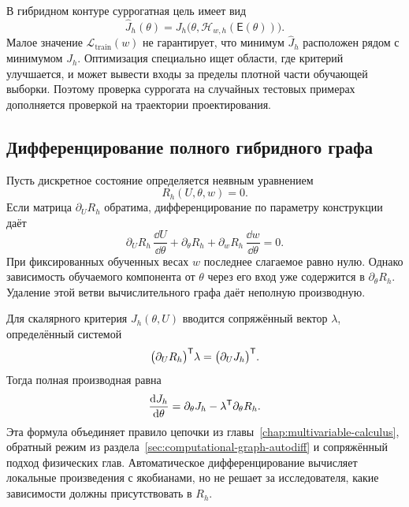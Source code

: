 В гибридном контуре суррогатная цель имеет вид
\begin{equation}
 \widehat J_h(\theta)
 =
 J_h\bigl(\theta,\mathcal H_{w,h}(\mathsf E(\theta))\bigr).
\end{equation}
Малое значение $\mathcal L_{\mathrm{train}}(w)$ не гарантирует, что минимум $\widehat J_h$ расположен рядом с минимумом $J_h$. Оптимизация специально ищет области, где критерий улучшается, и может вывести входы за пределы плотной части обучающей выборки. Поэтому проверка суррогата на случайных тестовых примерах дополняется проверкой на траектории проектирования.

\subsection{Дифференцирование полного гибридного графа}
Пусть дискретное состояние определяется неявным уравнением
\begin{equation}
 R_h(U,\theta,w)=0.
\end{equation}
Если матрица $\partial_U R_h$ обратима, дифференцирование по параметру конструкции даёт
\begin{equation}
 \partial_U R_h\,\frac{\dd U}{\dd\theta}
 +
 \partial_\theta R_h
 +
 \partial_w R_h\,\frac{\dd w}{\dd\theta}
 =0.
\end{equation}
При фиксированных обученных весах $w$ последнее слагаемое равно нулю. Однако зависимость обучаемого компонента от $\theta$ через его вход уже содержится в $\partial_\theta R_h$. Удаление этой ветви вычислительного графа даёт неполную производную.

Для скалярного критерия $J_h(\theta,U)$ вводится сопряжённый вектор $\lambda$, определённый системой
\begin{equation}
 \bigl(\partial_U R_h\bigr)^{\mathsf{T}}\lambda
 =
 \bigl(\partial_U J_h\bigr)^{\mathsf{T}}.
\end{equation}
Тогда полная производная равна
\begin{equation}
 \frac{\mathop{}\!\mathrm{d} J_h}{\mathop{}\!\mathrm{d}\theta}
 =
 \partial_\theta J_h
 -
 \lambda^{\mathsf{T}}\partial_\theta R_h.
\end{equation}
Эта формула объединяет правило цепочки из главы~\ref{chap:multivariable-calculus}, обратный режим из раздела~\ref{sec:computational-graph-autodiff} и сопряжённый подход физических глав. Автоматическое дифференцирование вычисляет локальные произведения с якобианами, но не решает за исследователя, какие зависимости должны присутствовать в $R_h$.

